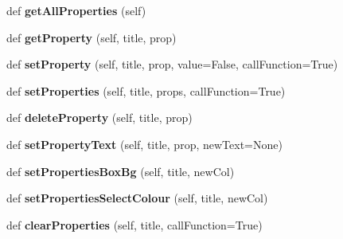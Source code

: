 \begin{DoxyCompactItemize}
\item 
\mbox{\label{class_python_01_g_u_i_1_1appjar_1_1gui_a3a746930ba124cadcf3a44dc1800c9fb}} 
def {\bfseries get\+All\+Properties} (self)
\item 
\mbox{\label{class_python_01_g_u_i_1_1appjar_1_1gui_ae3f8b598830679ffb210adb760ad137e}} 
def {\bfseries get\+Property} (self, title, prop)
\item 
\mbox{\label{class_python_01_g_u_i_1_1appjar_1_1gui_a8674231ea77979cbd375e71b89e32f94}} 
def {\bfseries set\+Property} (self, title, prop, value=False, call\+Function=True)
\item 
\mbox{\label{class_python_01_g_u_i_1_1appjar_1_1gui_ae4ab4820ccc6f3f878ac4019483dcd68}} 
def {\bfseries set\+Properties} (self, title, props, call\+Function=True)
\item 
\mbox{\label{class_python_01_g_u_i_1_1appjar_1_1gui_a98161d4fac2cc4c7ea6b83fc817fc631}} 
def {\bfseries delete\+Property} (self, title, prop)
\item 
\mbox{\label{class_python_01_g_u_i_1_1appjar_1_1gui_a01556be924dbb540d7f67cc766536423}} 
def {\bfseries set\+Property\+Text} (self, title, prop, new\+Text=None)
\item 
\mbox{\label{class_python_01_g_u_i_1_1appjar_1_1gui_a6129b70bade42ec71354e3a9743ecaa2}} 
def {\bfseries set\+Properties\+Box\+Bg} (self, title, new\+Col)
\item 
\mbox{\label{class_python_01_g_u_i_1_1appjar_1_1gui_a6fa2522aa4e22703e49117de6ae144fc}} 
def {\bfseries set\+Properties\+Select\+Colour} (self, title, new\+Col)
\item 
\mbox{\label{class_python_01_g_u_i_1_1appjar_1_1gui_ae23f34a3dd359056ff8fdd898c3118b1}} 
def {\bfseries clear\+Properties} (self, title, call\+Function=True)
\item 

\end{DoxyCompactItemize}
